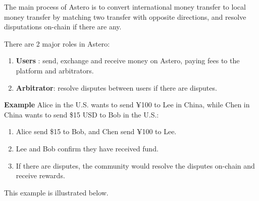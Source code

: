 \documentclass[letterpaper,twocolumn,10pt]{article}
\begin{document}
The main process of Astero is to convert international money transfer to local money transfer by matching two transfer with opposite directions, and resolve disputations on-chain if there are any.

There are 2 major roles in Astero:
\begin{enumerate}
    \item \textbf{Users} : send, exchange and receive money on Astero, paying fees to the platform and arbitrators.
    \item \textbf{Arbitrator}: resolve disputes between users if there are disputes.
\end{enumerate}

\textbf{Example} Alice in the U.S. wants to send ¥100 to Lee in China, while Chen in China wants to send \$15 USD to Bob in the U.S.:
\begin{enumerate}
    \item Alice send \$15 to Bob, and Chen send ¥100 to Lee. 
    \item Lee and Bob confirm they have received fund.
    \item If there are disputes, the community would resolve the disputes on-chain and receive rewards.
\end{enumerate}

This example is illustrated below.

\end{document}
